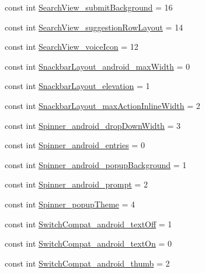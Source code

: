 \begin{CompactItemize}
const int \hyperlink{class__2doo_1_1_droid_1_1_resource_1_1_styleable_2a291b2c637f56ad50aec8110b8336fc}{SearchView\_\-submitBackground} = 16
\item 
const int \hyperlink{class__2doo_1_1_droid_1_1_resource_1_1_styleable_cb884cce5343aa85134a5b9833fc5c7b}{SearchView\_\-suggestionRowLayout} = 14
\item 
const int \hyperlink{class__2doo_1_1_droid_1_1_resource_1_1_styleable_a5d5f1738e83ba436a351b7bacb4e428}{SearchView\_\-voiceIcon} = 12
\item 
const int \hyperlink{class__2doo_1_1_droid_1_1_resource_1_1_styleable_7294a484422d9d185e6e64e3b0e971ea}{SnackbarLayout\_\-android\_\-maxWidth} = 0
\item 
const int \hyperlink{class__2doo_1_1_droid_1_1_resource_1_1_styleable_66ce70df2b211dd963d4c20b5277f63c}{SnackbarLayout\_\-elevation} = 1
\item 
const int \hyperlink{class__2doo_1_1_droid_1_1_resource_1_1_styleable_c5c4acfa6d1fbcc6fc4b2f17f83b781b}{SnackbarLayout\_\-maxActionInlineWidth} = 2
\item 
const int \hyperlink{class__2doo_1_1_droid_1_1_resource_1_1_styleable_193edf19ea60e2d74cd266ade278dae0}{Spinner\_\-android\_\-dropDownWidth} = 3
\item 
const int \hyperlink{class__2doo_1_1_droid_1_1_resource_1_1_styleable_575085b97bddd32a05384eec6a0c5cb0}{Spinner\_\-android\_\-entries} = 0
\item 
const int \hyperlink{class__2doo_1_1_droid_1_1_resource_1_1_styleable_813a3b36f7ad287ffaea98ebb438584b}{Spinner\_\-android\_\-popupBackground} = 1
\item 
const int \hyperlink{class__2doo_1_1_droid_1_1_resource_1_1_styleable_f365be7a71f87a8f704aee101d180097}{Spinner\_\-android\_\-prompt} = 2
\item 
const int \hyperlink{class__2doo_1_1_droid_1_1_resource_1_1_styleable_f91cf58f8222a2c1f51603f1c39c5abc}{Spinner\_\-popupTheme} = 4
\item 
const int \hyperlink{class__2doo_1_1_droid_1_1_resource_1_1_styleable_0c16d883f083a81f8b0004f20105b010}{SwitchCompat\_\-android\_\-textOff} = 1
\item 
const int \hyperlink{class__2doo_1_1_droid_1_1_resource_1_1_styleable_7e0a8ddd98d014840654ae4b65e74cfa}{SwitchCompat\_\-android\_\-textOn} = 0
\item 
const int \hyperlink{class__2doo_1_1_droid_1_1_resource_1_1_styleable_2dc0ef79a17ec611242778adda68aa88}{SwitchCompat\_\-android\_\-thumb} = 2
\item 

\end{CompactItemize}
